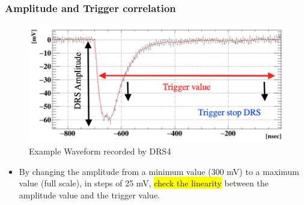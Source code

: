 \begin{frame} [fragile]
\small
	\frametitle{Amplitude and Trigger correlation}
    		\begin{figure}
		 \centering
			\includegraphics[scale=0.3]{figures/instruments/Waveform_trigger.png}
			\caption{Example Waveform recorded by DRS4}
		\end{figure}  
	\begin{itemize}
		\item By changing the amplitude from a minimum value (300 mV) to a maximum value (full scale), in steps of 25 mV, \colorbox{yellow}{check the linearity} between the amplitude value and the trigger value.
	\end{itemize}
\end{frame}

